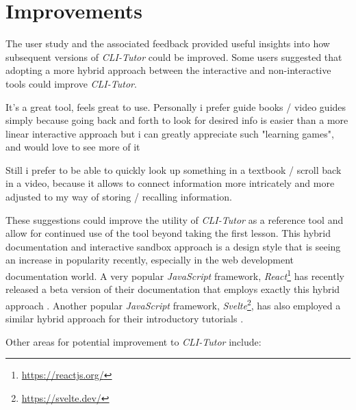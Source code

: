 \section{Improvements}

The user study and the associated feedback provided useful insights into how subsequent versions of \textit{CLI-Tutor} could be improved. Some users suggested that adopting a more hybrid approach between the interactive and non-interactive tools could improve \textit{CLI-Tutor}.

\begin{quotes}
	It's a great tool, feels great to use. Personally i prefer guide books / video guides simply
	because going back and forth to look for desired info is easier than a more linear interactive
	approach but i can greatly appreciate such "learning games", and would love to see more of it
\end{quotes}

\begin{quotes}
	Still i prefer to be able to quickly look up something in a textbook / scroll back in a video,
	because it allows to connect information more intricately and more adjusted to my way of
	storing / recalling information.
\end{quotes}

These suggestions could improve the utility of \textit{CLI-Tutor} as a
reference tool and allow for continued use of the tool beyond taking the first
lesson. This hybrid documentation and interactive sandbox approach is a design
style that is seeing an increase in popularity recently, especially in the web
development documentation world. A very popular  \textit{JavaScript} framework,
\textit{React}\footnote{\url{https://reactjs.org/}} has recently released a
beta version of their documentation that employs exactly this hybrid approach
\cite{team_meta}. Another popular \textit{JavaScript} framework,
\textit{Svelte}\footnote{\url{https://svelte.dev/}}, has also employed a similar
hybrid approach for their introductory tutorials \cite{harris_team}.


Other areas for potential improvement to \textit{CLI-Tutor} include:

